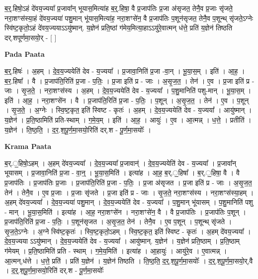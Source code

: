 \documentclass[17pt]{extarticle}
\begin{document}
ब॒र्॒.हिषो॒ऽहं दे॑वय॒ज्यया᳚ प्र॒जावा᳚न् भूयास॒मित्या॑ह ब॒र्॒.हिषा॒ वै प्र॒जाप॑तिः प्र॒जा अ॑सृजत॒ तेनै॒व प्र॒जाः सृ॑जते॒ नरा॒शꣳस॑स्या॒हं दे॑वय॒ज्यया॑ पशु॒मान् भू॑यास॒मित्या॑ह॒ नरा॒शꣳसे॑न॒ वै प्र॒जाप॑तिः प॒शून॑सृजत॒ तेनै॒व प॒शून्थ् सृ॑जते॒ऽग्नेः स्वि॑ष्ट॒कृतो॒ऽहं दे॑वय॒ज्ययाऽऽयु॑ष्मान्. य॒ज्ञेन॑ प्रति॒ष्ठां ग॑मेय॒मित्या॒हाऽऽयु॑रे॒वात्मन् ध॑त्ते॒ प्रति॑ य॒ज्ञेन॑ तिष्ठति दर्.शपूर्णमा॒सयो॒र् - [ ] \newline

\textbf{Pada Paata} \newline

ब॒र्॒.हिषः॑ । अ॒हम् । दे॒व॒य॒ज्ययेति॑ देव - य॒ज्यया᳚ । प्र॒जावा॒निति॑ प्र॒जा -वा॒न् । भू॒या॒स॒म् । इति॑ । आ॒ह॒ । ब॒र॒.हिषा᳚ । वै । प्र॒जाप॑ति॒रिति॑ प्र॒जा - प॒तिः॒ । प्र॒जा इति॑ प्र - जाः । अ॒सृ॒ज॒त॒ । तेन॑ । ए॒व । प्र॒जा इति॑ प्र - जाः । सृ॒ज॒ते॒ । नरा॒शꣳस॑स्य । अ॒हम् । दे॒व॒य॒ज्ययेति॑ देव - य॒ज्यया᳚ । प॒शु॒मानिति॑ पशु-मान् । भू॒या॒स॒म् । इति॑ । आ॒ह॒ । नरा॒शꣳसे॑न । वै । प्र॒जाप॑ति॒रिति॑ प्र॒जा - प॒तिः॒ । प॒शून् । अ॒सृ॒ज॒त॒ । तेन॑ । ए॒व । प॒शून् । सृ॒ज॒ते॒ । अ॒ग्नेः । स्वि॒ष्ट॒कृत॒ इति॑ स्विष्ट - कृतः॑ । अ॒हम् । दे॒व॒य॒ज्ययेति॑ देव - य॒ज्यया᳚ । आयु॑ष्मान् । य॒ज्ञेन॑ । प्र॒ति॒ष्ठामिति॑ प्रति-स्थाम् । ग॒मे॒य॒म् । इति॑ । आ॒ह॒ । आयुः॑ । ए॒व । आ॒त्मन्न् । ध॒त्ते॒ । प्रतीति॑ । य॒ज्ञेन॑ । ति॒ष्ठ॒ति॒ । द॒र॒.श॒पू॒र्ण॒मा॒सयो॒रिति॑ दर्.श - पू॒र्ण॒मा॒सयोः᳚ ।  \newline


\textbf{Krama Paata} \newline

ब॒र्.॒॒हिषो॒ऽहम् । अ॒हम् दे॑वय॒ज्यया᳚ । दे॒व॒य॒ज्यया᳚ प्र॒जावान्॑ । दे॒व॒य॒ज्ययेति॑ देव - य॒ज्यया᳚ । प्र॒जावा᳚न् भूयासम् । प्र॒जावा॒निति॑ प्र॒जा - वा॒न्॒ । भू॒या॒स॒मिति॑ । इत्या॑ह । आ॒ह॒ ब॒र्.॒॒॒हिषा᳚ । ब॒र्.॒॒॒हिषा॒ वै । वै प्र॒जाप॑तिः । प्र॒जाप॑तिः प्र॒जाः । प्र॒जाप॑ति॒रिति॑ प्र॒जा - प॒तिः॒ । प्र॒जा अ॑सृजत । प्र॒जा इति॑ प्र - जाः । अ॒सृ॒ज॒त॒ तेन॑ । तेनै॒व । ए॒व प्र॒जाः । प्र॒जाः सृ॑जते । प्र॒जा इति॑ प्र - जाः । सृ॒ज॒ते॒ नरा॒शꣳस॑स्य । नरा॒शꣳस॑स्या॒हम् । अ॒हम् दे॑वय॒ज्यया᳚ । दे॒व॒य॒ज्यया॑ पशु॒मान् । दे॒व॒य॒ज्ययेति॑ देव - य॒ज्यया᳚ । प॒शु॒मान् भू॑यासम् । प॒शु॒मानिति॑ पशु - मान् । भू॒या॒स॒मिति॑ । इत्या॑ह । आ॒ह॒ नरा॒शꣳसे॑न । नरा॒शꣳसे॑न॒ वै । वै प्र॒जाप॑तिः । प्र॒जाप॑तिः प॒शून् । प्र॒जाप॑ति॒रिति॑ प्र॒जा - प॒तिः॒ । प॒शून॑सृजत । अ॒सृ॒ज॒त॒ तेन॑ । तेनै॒व । ए॒व प॒शून् । प॒शून्थ् सृ॑जते । सृ॒ज॒ते॒ऽग्नेः । अ॒ग्ने स्वि॑ष्ट॒कृतः॑ । स्वि॒ष्ट॒कृतो॒ऽहम् । स्वि॒ष्ट॒कृत॒ इति॑ स्विष्ट - कृतः॑ । अ॒हम् दे॑वय॒ज्यया᳚ । दे॒व॒य॒ज्यया ऽऽयु॑ष्मान् । दे॒व॒य॒ज्ययेति॑ देव - य॒ज्यया᳚ । आयु॑ष्मान्. य॒ज्ञेन॑ । य॒ज्ञेन॑ प्रति॒ष्ठाम् । प्र॒ति॒ष्ठाम् ग॑मेयम् । प्र॒ति॒ष्ठामिति॑ प्रति - स्थाम् । ग॒मे॒य॒मिति॑ । इत्या॑ह । आ॒हायुः॑ । आयु॑रे॒व । ए॒वात्मन्न् । आ॒त्मन्,ध॑त्ते । ध॒त्ते॒ प्रति॑ । प्रति॑ य॒ज्ञेन॑ । य॒ज्ञेन॑ तिष्ठति । ति॒ष्ठ॒ति॒ द॒र्॒.श॒पू॒र्ण॒मा॒सयोः᳚ । द॒र्॒.श॒पू॒र्ण॒मा॒सयो॒र्,वै । द॒र्॒.श॒पू॒र्ण॒मा॒सयो॒रिति॑ दर्.श - पू॒र्ण॒मा॒सयोः᳚ \newline
\end{document}
